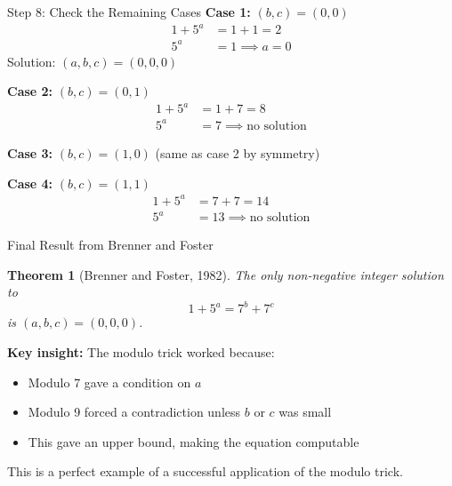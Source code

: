 ﻿\documentclass[10pt,aspectratio=169]{beamer}
\newtheorem*{theoremss}{Theorem}
\begin{document}
\begin{frame}{Step 8: Check the Remaining Cases}
    \textbf{Case 1:} $(b,c) = (0,0)$
    \begin{align*}
        1 + 5^a &= 1 + 1 = 2 \\
        5^a &= 1 \implies a = 0
    \end{align*}
    Solution: $(a,b,c) = (0,0,0)$
    
    \textbf{Case 2:} $(b,c) = (0,1)$
    \begin{align*}
        1 + 5^a &= 1 + 7 = 8 \\
        5^a &= 7 \implies \text{no solution}
    \end{align*}
    
    \textbf{Case 3:} $(b,c) = (1,0)$ (same as case 2 by symmetry)
    
    \textbf{Case 4:} $(b,c) = (1,1)$
    \begin{align*}
        1 + 5^a &= 7 + 7 = 14 \\
        5^a &= 13 \implies \text{no solution}
    \end{align*}
\end{frame}

\begin{frame}{Final Result from Brenner and Foster}
    \begin{theoremss}[Brenner and Foster, 1982]
        The only non-negative integer solution to
        \[1 + 5^a = 7^b + 7^c\]
        is $(a,b,c) = (0,0,0)$.
    \end{theoremss}
    
    \vspace{0.3cm}
    \textbf{Key insight:} The modulo trick worked because:
    \begin{itemize}
        \item Modulo 7 gave a condition on $a$
        \item Modulo 9 forced a contradiction unless $b$ or $c$ was small
        \item This gave an upper bound, making the equation computable
    \end{itemize}
    
    This is a perfect example of a successful application of the modulo trick.
\end{frame}

\end{document}
